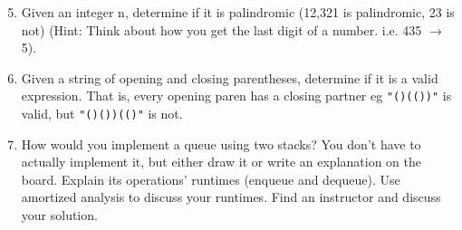 \documentclass{article}
\begin{document}
\begin{enumerate}

\setcounter{enumi}{4}
    
\item Given an integer n, determine if it is palindromic (12,321 is palindromic, 23 is not) (Hint: Think about how you get the last digit of a number. i.e. 435 $\rightarrow$ 5).

\item Given a string of opening and closing parentheses, determine if it is a valid expression. That is, every opening paren has a closing partner eg \texttt{"()(())"} is valid, but \texttt{"()())(()"} is not.

\item How would you implement a queue using two stacks? You don’t have to actually implement it, but either draw it or write an explanation on the board. Explain its operations’ runtimes (enqueue and dequeue). Use amortized analysis to discuss your runtimes. Find an instructor and discuss your solution.
\end{enumerate}


\clearpage
\end{document}

